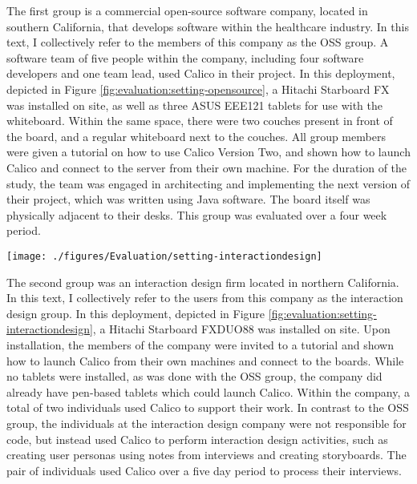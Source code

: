The first group is a commercial open-source software company, located in southern California, that develops software within the healthcare industry. In this text, I collectively refer to the members of this company as the OSS group. A software team of five people within the company, including four software developers and one team lead, used Calico in their project. In this deployment, depicted in Figure \ref{fig:evaluation:setting-opensource}, a Hitachi Starboard FX was installed on site, as well as three ASUS EEE121 tablets for use with the whiteboard. Within the same space, there were two couches present in front of the board, and a regular whiteboard next to the couches. All group members were given a tutorial on how to use Calico Version Two, and shown how to launch Calico and connect to the server from their own machine.  For the duration of the study, the team was engaged in architecting and implementing the next version of their project, which was written using Java software. The board itself was physically adjacent to their desks. This group was evaluated over a four week period.

\begin{figure*}[tbh]
  \centering
  \texttt{[image: ./figures/Evaluation/setting-interactiondesign]}
  \caption{A tutorial of the usage of Calico given to the interaction design group}
  \label{fig:evaluation:setting-interactiondesign}
\end{figure*}

The second group was an interaction design firm located in northern California. In this text, I collectively refer to the users from this company as the interaction design group. In this deployment, depicted in Figure \ref{fig:evaluation:setting-interactiondesign}, a Hitachi Starboard FXDUO88 was installed on site. Upon installation, the members of the company were invited to a tutorial and shown how to launch Calico from their own machines and connect to the boards. While no tablets were installed, as was done with the OSS group, the company did already have pen-based tablets which could launch Calico. Within the company, a total of two individuals used Calico to support their work. In contrast to the OSS group, the individuals at the interaction design company were not responsible for code, but instead used Calico to perform interaction design activities, such as creating user personas using notes from interviews and creating storyboards. The pair of individuals used Calico over a five day period to process their interviews.

